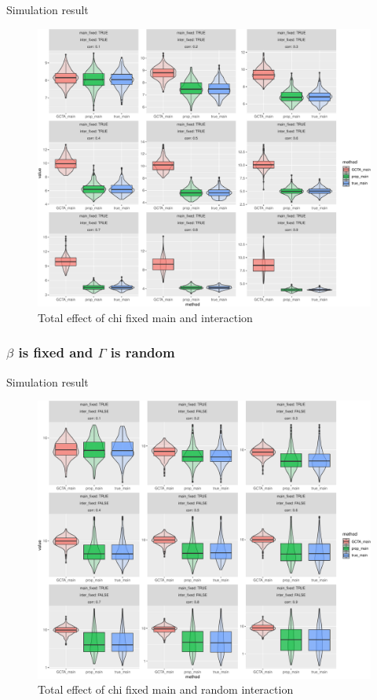 \documentclass[]{article}
\begin{document}
Simulation result

\begin{figure}
\centering
\includegraphics{Simulation_report_files/figure-latex/main_fixed_fixed_chi_combine-1.pdf}
\caption{Total effect of chi fixed main and interaction}
\end{figure}

\clearpage

\subsubsection{\texorpdfstring{\(\beta\) is fixed and \(\Gamma\) is
random}{\textbackslash{}beta is fixed and \textbackslash{}Gamma is random}}\label{beta-is-fixed-and-gamma-is-random-2}

Simulation result

\begin{figure}
\centering
\includegraphics{Simulation_report_files/figure-latex/main_fixed_random_chi_combine-1.pdf}
\caption{Total effect of chi fixed main and random interaction}
\end{figure}
\end{document}
